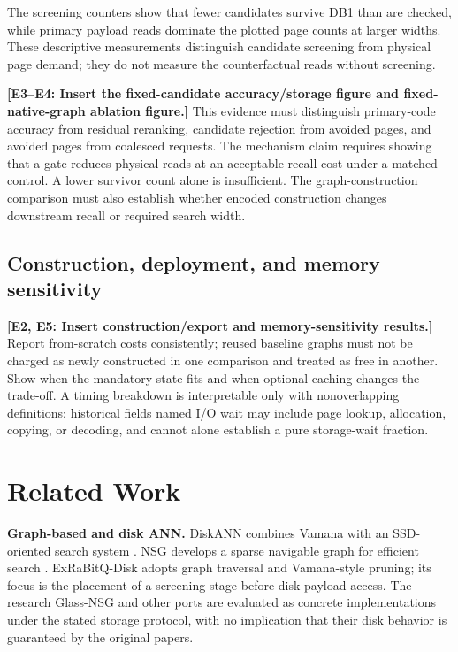 The screening counters show that fewer candidates survive DB1 than are checked, while primary payload reads dominate the plotted page counts at larger widths. These descriptive measurements distinguish candidate screening from physical page demand; they do not measure the counterfactual reads without screening.

\textbf{[E3--E4: Insert the fixed-candidate accuracy/storage figure and fixed-native-graph ablation figure.]} This evidence must distinguish primary-code accuracy from residual reranking, candidate rejection from avoided pages, and avoided pages from coalesced requests. The mechanism claim requires showing that a gate reduces physical reads at an acceptable recall cost under a matched control. A lower survivor count alone is insufficient. The graph-construction comparison must also establish whether encoded construction changes downstream recall or required search width.

\subsection{Construction, deployment, and memory sensitivity}

\textbf{[E2, E5: Insert construction/export and memory-sensitivity results.]} Report from-scratch costs consistently; reused baseline graphs must not be charged as newly constructed in one comparison and treated as free in another. Show when the mandatory state fits and when optional caching changes the trade-off. A timing breakdown is interpretable only with nonoverlapping definitions: historical fields named I/O wait may include page lookup, allocation, copying, or decoding, and cannot alone establish a pure storage-wait fraction.

\section{Related Work}

\textbf{Graph-based and disk ANN.} DiskANN combines Vamana with an SSD-oriented search system \cite{diskann}. NSG develops a sparse navigable graph for efficient search \cite{nsg}. ExRaBitQ-Disk adopts graph traversal and Vamana-style pruning; its focus is the placement of a screening stage before disk payload access. The research Glass-NSG and other ports are evaluated as concrete implementations under the stated storage protocol, with no implication that their disk behavior is guaranteed by the original papers.

